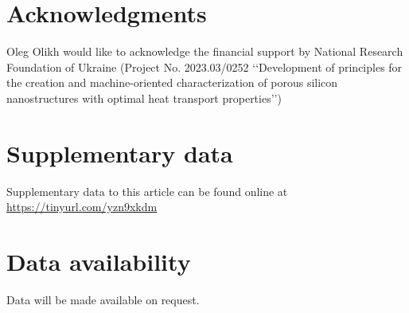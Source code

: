 \documentclass[a4paper,fleqn]{cas-sc}
\begin{document}
\section*{Acknowledgments}
Oleg Olikh would like to acknowledge the financial support by
National Research Foundation of Ukraine (Project No. 2023.03/0252
‘‘Development of principles for the creation and machine-oriented
characterization of porous silicon nanostructures with optimal
heat transport properties’’)

\section*{Supplementary data}\label{SuplData}
Supplementary data to this article can be found online at
\url{https://tinyurl.com/yzn9xkdm}

\section*{Data availability}
Data will be made available on request.





%


\end{document}
